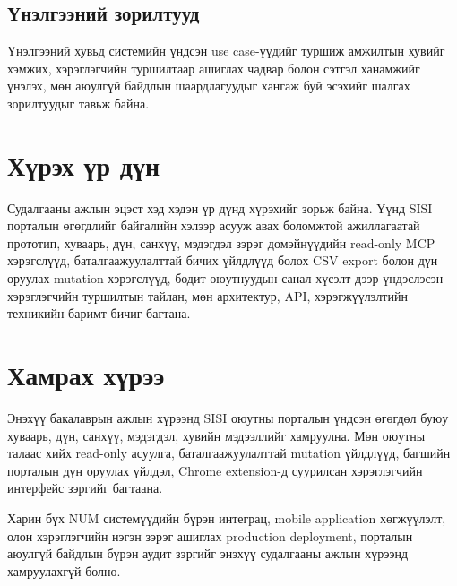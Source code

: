 \subsection{Үнэлгээний зорилтууд}

Үнэлгээний хувьд системийн үндсэн use case-үүдийг туршиж амжилтын хувийг хэмжих, хэрэглэгчийн туршилтаар ашиглах чадвар болон сэтгэл ханамжийг үнэлэх, мөн аюулгүй байдлын шаардлагуудыг хангаж буй эсэхийг шалгах зорилтуудыг тавьж байна.

\section{Хүрэх үр дүн}

Судалгааны ажлын эцэст хэд хэдэн үр дүнд хүрэхийг зорьж байна. Үүнд SISI порталын өгөгдлийг байгалийн хэлээр асууж авах боломжтой ажиллагаатай прототип, хуваарь, дүн, санхүү, мэдэгдэл зэрэг домэйнүүдийн read-only MCP хэрэгслүүд, баталгаажуулалттай бичих үйлдлүүд болох CSV export болон дүн оруулах mutation хэрэгслүүд, бодит оюутнуудын санал хүсэлт дээр үндэслэсэн хэрэглэгчийн туршилтын тайлан, мөн архитектур, API, хэрэгжүүлэлтийн техникийн баримт бичиг багтана.

\section{Хамрах хүрээ}

Энэхүү бакалаврын ажлын хүрээнд SISI оюутны порталын үндсэн өгөгдөл буюу хуваарь, дүн, санхүү, мэдэгдэл, хувийн мэдээллийг хамруулна. Мөн оюутны талаас хийх read-only асуулга, баталгаажуулалттай mutation үйлдлүүд, багшийн порталын дүн оруулах үйлдэл, Chrome extension-д суурилсан хэрэглэгчийн интерфейс зэргийг багтаана.

Харин бүх NUM системүүдийн бүрэн интеграц, mobile application хөгжүүлэлт, олон хэрэглэгчийн нэгэн зэрэг ашиглах production deployment, порталын аюулгүй байдлын бүрэн аудит зэргийг энэхүү судалгааны ажлын хүрээнд хамруулахгүй болно.
